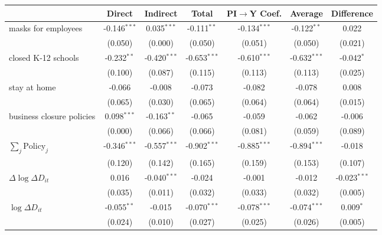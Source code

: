 
\begin{tabular}{lccccc|>{}c}
\toprule
  & Direct & Indirect & Total & PI$\to$Y Coef. & Average & Difference\\
\midrule
masks for employees & -0.146$^{***}$ & 0.035$^{***}$ & -0.111$^{**}$ & -0.134$^{***}$ & -0.122$^{**}$ & 0.022\\
 & (0.050) & (0.000) & (0.050) & (0.051) & (0.050) & (0.021)\\
closed K-12 schools & -0.232$^{**}$ & -0.420$^{***}$ & -0.653$^{***}$ & -0.610$^{***}$ & -0.632$^{***}$ & -0.042$^{*}$\\
 & (0.100) & (0.087) & (0.115) & (0.113) & (0.113) & (0.025)\\
stay at home & -0.066 & -0.008 & -0.073 & -0.082 & -0.078 & 0.008\\
 & (0.065) & (0.030) & (0.065) & (0.064) & (0.064) & (0.015)\\
business closure policies & 0.098$^{***}$ & -0.163$^{**}$ & -0.065 & -0.059 & -0.062 & -0.006\\
 & (0.000) & (0.066) & (0.066) & (0.081) & (0.059) & (0.089)\\
$\sum_j \mathrm{Policy}_j$ & -0.346$^{***}$ & -0.557$^{***}$ & -0.902$^{***}$ & -0.885$^{***}$ & -0.894$^{***}$ & -0.018\\
 & (0.120) & (0.142) & (0.165) & (0.159) & (0.153) & (0.107)\\
$\Delta \log \Delta D_{it}$ & 0.016 & -0.040$^{***}$ & -0.024 & -0.001 & -0.012 & -0.023$^{***}$\\
 & (0.035) & (0.011) & (0.032) & (0.033) & (0.032) & (0.005)\\
$\log \Delta D_{it}$ & -0.055$^{**}$ & -0.015 & -0.070$^{***}$ & -0.078$^{***}$ & -0.074$^{***}$ & 0.009$^{*}$\\
 & (0.024) & (0.010) & (0.027) & (0.025) & (0.026) & (0.005)\\
\bottomrule
\end{tabular}